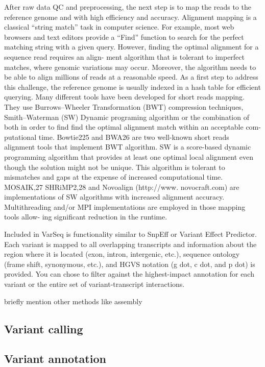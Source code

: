 After raw data QC and preprocessing, the next step is to map the reads to the reference genome and with high efficiency and accuracy. Alignment mapping is a classical “string match” task in computer science. For example, most web browsers and text editors provide a “Find” function to search for the perfect matching string with a given query. However, finding the optimal alignment for a sequence read requires an align- ment algorithm that is tolerant to imperfect matches, where genomic variations may occur. Moreover, the algorithm needs to be able to align millions of reads at a reasonable speed. As a first step to address this challenge, the reference genome is usually indexed in a hash table for efficient querying. Many different tools have been developed for short reads
mapping. They use Burrows–Wheeler Transformation (BWT) compression techniques, Smith–Waterman (SW) Dynamic programing algorithm or the combination of both in order to
find find the optimal alignment match within an acceptable com- putational time. Bowtie225 and BWA26 are two well-known short reads
alignment tools that implement BWT algorithm. SW is a score-based dynamic programming algorithm that provides at least one optimal local alignment even though the solution might not be unique. This algorithm is tolerant to mismatches and gaps at the expense of increased computational time. MOSAIK,27 SHRiMP2,28 and Novoalign (http://www. novocraft.com) are implementations of SW algorithms with increased alignment accuracy. Multithreading and/or MPI implementations are employed in those mapping tools allow- ing significant reduction in the runtime.

Included in VarSeq is functionality similar to SnpEff or Variant Effect Predictor. Each variant is mapped to all overlapping transcripts and information about the region where it is located (exon, intron, intergenic, etc.), sequence ontology (frame shift, synonymous, etc.), and HGVS notation (g dot, c dot, and p dot) is provided. You can chose to filter against the highest-impact annotation for each variant or the entire set of variant-transcript interactions.

briefly mention other methods like assembly

\subsection{Variant calling}

\subsection{Variant annotation}

